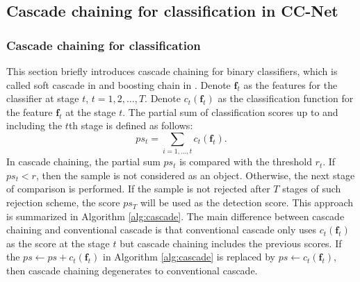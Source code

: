 \documentclass[10pt,twocolumn,letterpaper]{article}
\begin{document}

\subsection{Cascade chaining for classification in CC-Net}
\label{Sec:ClsChain}
\subsubsection{Cascade chaining for classification}
This section briefly introduces cascade chaining for  binary classifiers, which is called soft cascade in \cite{bourdev2005robust} and boosting chain in \cite{xiao2003boosting}. 
Denote $\mathbf{f}_t$ as the features for the classifier at stage $t$, $t=1, 2, \ldots, T$. Denote $c_t(\mathbf{f}_t)$ as the classification function for the feature $\mathbf{f}_t$ at the stage $t$. 
The partial sum of classification scores up to and including the $t$th stage is defined as follows:
\begin{equation}
ps_t = \sum_{i=1, \ldots, t} c_t(\mathbf{f}_t).
\end{equation}
In cascade chaining, the partial sum $ps_t$ is compared with the threshold $r_t$. If  $ps_t<r$, then the sample is not considered as an object. Otherwise, the next stage of comparison is performed. If the sample is not rejected after $T$ stages of such rejection scheme, the score $ps_T$ will be used as the detection score. This approach is summarized in Algorithm \ref{alg:cascade}.
The main difference between cascade chaining and conventional cascade is that conventional cascade only uses $c_t(\mathbf{f}_t)$ as the score at the stage $t$ but cascade chaining includes the previous scores. If the $ps \leftarrow  ps +  c_t(\mathbf{f}_t)$ in Algorithm \ref{alg:cascade}  is replaced by $ps \leftarrow  c_t(\mathbf{f}_t)$, then cascade chaining degenerates to conventional cascade.
\end{document}
